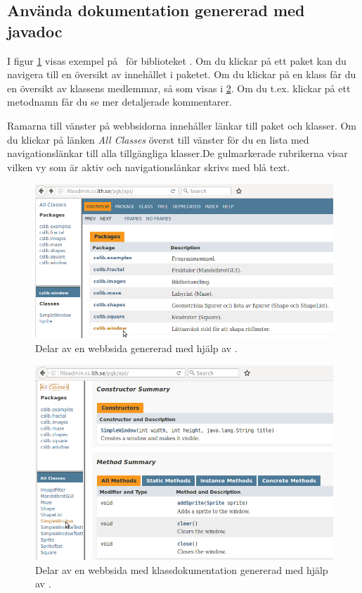 \subsection{Använda dokumentation genererad med javadoc}

I figur \ref{fig:javadoc:overview} visas exempel på \javadoc~för biblioteket . Om du klickar på ett paket kan du navigera till en översikt av innehållet i paketet. Om du klickar på en klass får du en översikt av klassens medlemmar, så som visas i \ref{fig:javadoc:class}.  Om du t.ex. klickar på ett metodnamn får du se mer detaljerade kommentarer. 

Ramarna till vänster på webbsidorna innehåller länkar till paket och klasser. Om du klickar på länken \textit{All Classes} överst till vänster för du en lista med navigationslänkar till alla tillgängliga klasser.De gulmarkerade rubrikerna visar vilken vy som är aktiv och navigationslänkar skrivs med blå text.

\begin{figure}
\includegraphics[width=1.0\textwidth]{../img/javadoc/javadoc-overview}
    \caption{Delar av en webbsida genererad med hjälp av \javadoc.}
    \label{fig:javadoc:overview}
\end{figure}



\begin{figure}
\includegraphics[width=1.0\textwidth]{../img/javadoc/javadoc-class}
    \caption{Delar av en webbsida med klassdokumentation genererad med hjälp av \javadoc.}
    \label{fig:javadoc:class}
\end{figure}






